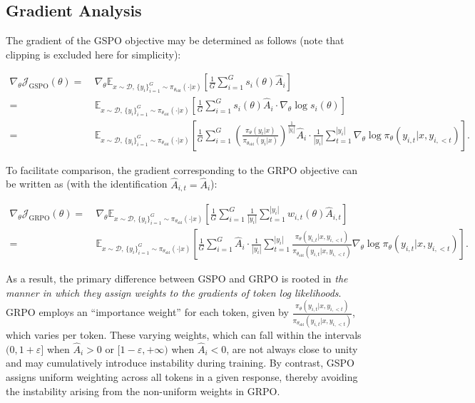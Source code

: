 \subsection{Gradient Analysis}
\label{subsec:gradient}

The gradient of the GSPO objective may be determined as follows (note that clipping is excluded here for simplicity):

\begin{align}
\nabla_{\theta} \mathcal{J}_\text{GSPO} (\theta)
=&\ 
\nabla_{\theta} \mathbb{E}_{ x \sim \mathcal{D},\, \{y_i\}_{i=1}^G \sim \pi_{\theta_\text{old}}( \cdot | x) }
\left[ 
\frac{1}{G} \sum_{i=1}^{G} s_{i}(\theta) \widehat{A}_{i}
\right] \\
= &\ 
\mathbb{E}_{ x \sim \mathcal{D},\, \{y_i\}_{i=1}^G \sim \pi_{\theta_\text{old}}( \cdot | x) }
\left[ 
\frac{1}{G} \sum_{i=1}^{G}
s_{i}(\theta) \widehat{A}_{i}
\cdot \nabla_{\theta} \log s_{i}(\theta)
\right] \\
=&\ 
\mathbb{E}_{ x \sim \mathcal{D},\, \{y_i\}_{i=1}^G \sim \pi_{\theta_\text{old}}( \cdot | x) }
\left[ 
\frac{1}{G} \sum_{i=1}^{G} 
\left( \frac{ \pi_{\theta} (y_i | x) }{ \pi_{\theta_\text{old}} (y_i | x)} \right)^{\frac{1}{|y_i|}} \widehat{A}_{i} 
\cdot \frac{1}{|y_i|} \sum_{t=1}^{|y_i|} \nabla_{\theta} \log \pi_{\theta} (y_{i,t} | x, y_{i,<t}) 
\right].
\label{equ:gspo_grad}
\end{align}

To facilitate comparison, the gradient corresponding to the GRPO objective can be written as (with the identification $\widehat{A}_{i,t} = \widehat{A}_{i}$):

\begin{align}
\nabla_{\theta} \mathcal{J}_\text{GRPO} (\theta) 
=&\ 
\nabla_{\theta} \mathbb{E}_{ x \sim \mathcal{D},\, \{y_i\}_{i=1}^G \sim \pi_{\theta_\text{old}}( \cdot | x) }
\left[ \frac{1}{G} \sum_{i=1}^{G} \frac{1}{|y_i|} \sum_{t=1}^{|y_i|} 
w_{i,t}(\theta) \widehat{A}_{i,t}
\right] \\
=&\
\mathbb{E}_{ x \sim \mathcal{D},\, \{y_i\}_{i=1}^G \sim \pi_{\theta_\text{old}}( \cdot | x) }
\left[ \frac{1}{G} \sum_{i=1}^{G} \widehat{A}_{i} 
\cdot \frac{1}{|y_i|} \sum_{t=1}^{|y_i|} 
\frac{ \pi_{\theta} (y_{i,t} | x, y_{i,<t}) }{ \pi_{\theta_\text{old}} (y_{i,t} | x,y_{i,<t})} 
\nabla_{\theta} \log \pi_{\theta} (y_{i,t} | x, y_{i,<t})  
\right].
\end{align}

As a result, the primary difference between GSPO and GRPO is rooted in \textit{the manner in which they assign weights to the gradients of token log likelihoods}. GRPO employs an ``importance weight'' for each token, given by $\frac{ \pi_{\theta} (y_{i,t} | x, y_{i,<t}) }{ \pi_{\theta_\text{old}} (y_{i,t} | x,y_{i,<t})}$, which varies per token. These varying weights, which can fall within the intervals $(0, 1+\varepsilon]$ when $\widehat{A}_{i} >0$ or $[1-\varepsilon, +\infty)$ when $\widehat{A}_{i} < 0$, are not always close to unity and may cumulatively introduce instability during training. By contrast, GSPO assigns uniform weighting across all tokens in a given response, thereby avoiding the instability arising from the non-uniform weights in GRPO.

